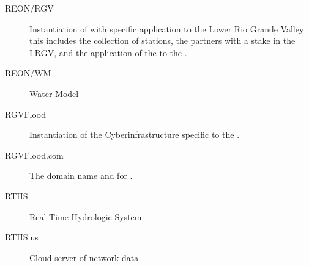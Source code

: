 \documentclass[letterpaper,10pt,english]{sphinxmanual}
\begin{document}
\begin{description}
\item[{REON/RGV\label{\detokenize{glossary:term-REON-RGV}}}] \leavevmode
\sphinxAtStartPar
Instantiation of {\hyperref[\detokenize{glossary:term-REON}]{}} with specific application to the Lower Rio Grande Valley \sphinxhyphen{} this includes the collection of {\hyperref[\detokenize{glossary:term-RTHS}]{}} stations, the {\hyperref[\detokenize{glossary:term-REON}]{}} partners with a stake in the LRGV, and the application of the {\hyperref[\detokenize{glossary:term-REON-WM}]{}} to the {\hyperref[\detokenize{glossary:term-LRGV}]{}}.

\item[{REON/WM\label{\detokenize{glossary:term-REON-WM}}}] \leavevmode
\sphinxAtStartPar
{\hyperref[\detokenize{glossary:term-REON}]{}} Water Model

\item[{RGVFlood\label{\detokenize{glossary:term-RGVFlood}}}] \leavevmode
\sphinxAtStartPar
Instantiation of the {\hyperref[\detokenize{glossary:term-REON}]{}} Cyberinfrastructure specific to the {\hyperref[\detokenize{glossary:term-LRGV}]{}}.

\item[{RGVFlood.com\label{\detokenize{glossary:term-RGVFlood.com}}}] \leavevmode
\sphinxAtStartPar
The domain name and {\hyperref[\detokenize{glossary:term-URL}]{}} for {\hyperref[\detokenize{glossary:term-RGVFlood}]{}}.

\item[{RTHS\label{\detokenize{glossary:term-RTHS}}}] \leavevmode
\sphinxAtStartPar
Real Time Hydrologic System

\item[{RTHS.us\label{\detokenize{glossary:term-RTHS.us}}}] \leavevmode
\sphinxAtStartPar
Cloud server of {\hyperref[\detokenize{glossary:term-RTHS}]{}} network data


\end{description}
\end{document}
